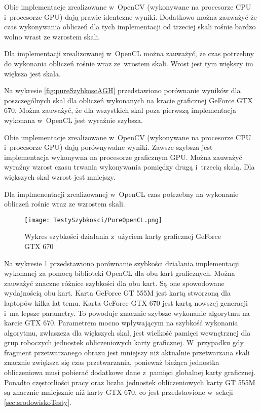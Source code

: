 Obie implementacje zrealizowane w~OpenCV (wykonywane na procesorze CPU i~procesorze GPU) dają prawie identczne wyniki. Dodatkowo można zauważyć że czas wykonywania obliczeń dla tych implementacji od trzeciej skali rośnie bardzo wolno wrast ze wzrostem skali.

Dla implementacji zrealizowanej w~OpenCL można zauważyć, że czas potrzebny do wykonania obliczeń rośnie wraz ze~wrostem skali. Wrost jest tym większy im większa jest skala.

Na wykresie \ref{fig:pureSzybkoscAGH} przedstawiono porównanie wyników dla poszczególnych skal dla obliczeń wykonanych na kracie graficznej GeForce GTX 670. Można zauważyć, że dla wszystkich skal poza pierwszą implementacja wykonana w~OpenCL jest wyraźnie szybsza.

Obie implementacje zrealizowane w~OpenCV (wykonywane na procesorze CPU i~procesorze GPU) dają porównywalne wyniki. Zawsze szybsza jest implementacja wykonywna na procesorze graficznym GPU. Można zauważyć wyraźny wzrost czasu trwania wykonywania pomiędzy drugą i~trzecią skalą. Dla większych skal wzrost jest mniejszy. 

Dla implmenentacji zrealizowanej w~OpenCL czas potrzebny na wykonanie obliczeń rośnie wraz ze wzrostem skali. 

\begin{figure}[h]
\begin{center}
\texttt{[image: TestySzybkosci/PureOpenCL.png]}
\end{center}
\caption{Wykres szybkości działania z~użyciem karty graficznej GeForce GTX 670}
\label{fig:pureOpenCL}
\end{figure}

Na wykresie \ref{fig:pureOpenCL} przedstawiono porównanie szybkości działania implementacji wykonanej za pomocą biblioteki OpenCL dla obu kart graficznych. Można zauważyć znaczne różnice szybkości dla obu kart. Są one spowodowane wydajnością obu kart. Karta GeForce GT 555M jest kartą stworzoną dla laptopów kilka lat temu. Karta GeForce GTX 670 jest kartą nowszej generacji i~ma lepsze parametry. To powoduje znacznie szybsze wykonanie algorytmu na karcie GTX 670. Parametrem mocno wpływającym na szybkość wykonania algorytmu, zwłaszcza dla większych skal, jest wielkość pamięci wewnętrznej dla grup roboczych jednostek obliczeniowych karty graficznej. W~przypadku gdy fragment przetwarzanego obrazu jest mniejszy niż aktualnie przetwarzana skali znacznie zwiększa się czas przetwarzania, ponieważ bieżąca jednostka obliczeniowa musi pobierać dodatkowe dane z~pamięci globalnej karty graficznej. Ponadto częstotliości pracy oraz liczba jednostek obliczeniowych karty GT 555M są znacznie mniejsznie niż karty GTX 670, co jest przedstawione w~sekcji \ref{sec:srodowiskoTesty}.
